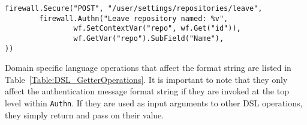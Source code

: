 \begin{lstlisting}[float=h]
firewall.Secure("POST", "/user/settings/repositories/leave", 
        firewall.Authn("Leave repository named: %v",
                wf.SetContextVar("repo", wf.Get("id")),
                wf.GetVar("repo").SubField("Name"),
))
\end{lstlisting}

Domain specific language operations that affect the format string are listed in Table~\ref{Table:DSL_GetterOperations}. It is important to note that they only affect the authentication message format string if they are invoked at the top level within \lstinline{Authn}. If they are used as input arguments to other DSL operations, they simply return and pass on their value.


